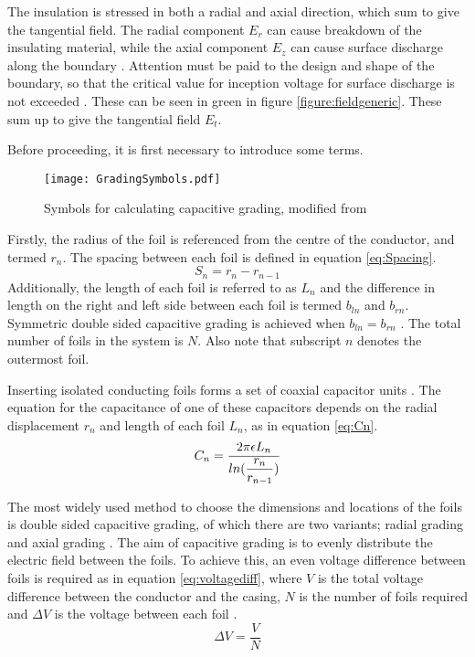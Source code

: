 The insulation is stressed in both a radial and axial direction, which sum to give the tangential field.
The radial component $E_r$ can cause breakdown of the insulating material, while the axial component $E_z$ can cause surface discharge along the boundary \cite{Ahmed11}.
Attention must be paid to the design and shape of the boundary, so that the critical value for inception voltage for surface discharge is not exceeded \cite{}.
These can be seen in green in figure \ref{figure:fieldgeneric}.
These sum up to give the tangential field $E_t$.

Before proceeding, it is first necessary to introduce some terms.
\begin{figure}[!h]
   \centering
   \texttt{[image: GradingSymbols.pdf]}
   \caption{Symbols for calculating capacitive grading, modified from \cite{Ahmed11}}
   \label{figure:terms}
\end{figure}
Firstly, the radius of the foil is referenced from the centre of the conductor, and termed $r_n$. 
The spacing between each foil is defined in equation \ref{eq:Spacing}.
\begin{equation}
   \label{eq:Spacing}
   S_n = r_n - r_{n-1}
\end{equation}
Additionally, the length of each foil is referred to as $L_n$ and the difference in length on the right and left side between each foil is termed $b_{ln}$ and $b_{rn}$. 
Symmetric double sided capacitive grading is achieved when $b_{ln}=b_{rn}$ \cite{Ahmed11}. 
The total number of foils in the system is $N$.
Also note that subscript $n$ denotes the outermost foil.

Inserting isolated conducting foils forms a set of coaxial capacitor units \cite{kuffel2000high}.
The equation for the capacitance of one of these capacitors depends on the radial displacement $r_n$ and length of each foil $L_n$, as in equation \ref{eq:Cn}.
\begin{equation}
   \label{eq:Cn}
   C_n =\displaystyle\displaystyle\frac{2\pi\epsilon L_{n}}{ln(\displaystyle\frac{r_{n}}{r_{n-1}})}
\end{equation}

The most widely used method to choose the dimensions and locations of the foils is double sided capacitive grading, of which there are two variants; radial grading and axial grading \cite{Ahmed11}.
The aim of capacitive grading is to evenly distribute the electric field between the foils.
To achieve this, an even voltage difference between foils is required as in equation \ref{eq:voltagediff}, where $V$ is the total voltage difference between the conductor and the casing, $N$ is the number of foils required and $\Delta V$ is the voltage between each foil \cite{}.
\begin{equation}
   \label{eq:voltagediff}
   \Delta V = \displaystyle\frac{V}{N}
\end{equation}

